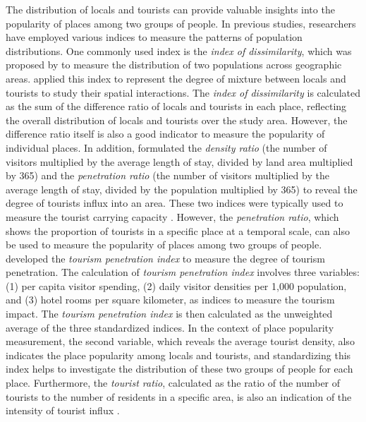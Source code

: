 \documentclass{article}
\theoremstyle{remark}
\begin{document}
The distribution of locals and tourists can provide valuable insights into the popularity of places among two groups of people. In previous studies, researchers have employed various indices to measure the patterns of population distributions. One commonly used index is the \textit{index of dissimilarity}, which was proposed by \cite{sakoda_generalized_1981} to measure the distribution of two populations across geographic areas. \cite{li_analyzing_2018} applied this index to represent the degree of mixture between locals and tourists to study their spatial interactions. The \textit{index of dissimilarity} is calculated as the sum of the difference ratio of locals and tourists in each place, reflecting the overall distribution of locals and tourists over the study area. However, the difference ratio itself is also a good indicator to measure the popularity of individual places. In addition, \cite{mcelroy_applying_1993} formulated the \textit{density ratio} (the number of visitors multiplied by the average length of stay, divided by land area multiplied by 365) and the \textit{penetration ratio} (the number of visitors multiplied by the average length of stay, divided by the population multiplied by 365) to reveal the degree of tourists influx into an area. These two indices were typically used to measure the tourist carrying capacity \citep{mcelroy_applying_1993,thomas_tourist_2005}. However, the \textit{penetration ratio}, which shows the proportion of tourists in a specific place at a temporal scale, can also be used to measure the popularity of places among two groups of people. \cite{mcelroy_applying_1993,mcelroy_tourism_1998} developed the \textit{tourism penetration index} to measure the degree of tourism penetration. The calculation of \textit{tourism penetration index} involves three variables: (1) per capita visitor spending, (2) daily visitor densities per 1,000 population, and (3) hotel rooms per square kilometer, as indices to measure the tourism impact. The \textit{tourism penetration index} is then calculated as the unweighted average of the three standardized indices. In the context of place popularity measurement, the second variable, which reveals the average tourist density, also indicates the place popularity among locals and tourists, and standardizing this index helps to investigate the distribution of these two groups of people for each place. Furthermore, the \textit{tourist ratio}, calculated as the ratio of the number of tourists to the number of residents in a specific area, is also an indication of the intensity of tourist influx \citep{faulkner_framework_1997}. 
\end{document}
